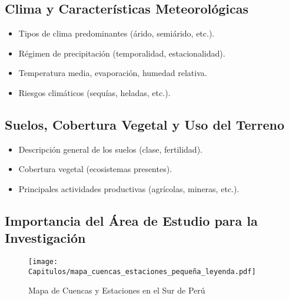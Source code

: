\subsection{Clima y Características Meteorológicas}
  \begin{itemize}
    \item Tipos de clima predominantes (árido, semiárido, etc.).
    \item Régimen de precipitación (temporalidad, estacionalidad).
    \item Temperatura media, evaporación, humedad relativa.
    \item Riesgos climáticos (sequías, heladas, etc.).
  \end{itemize}

\subsection{Suelos, Cobertura Vegetal y Uso del Terreno}
  \begin{itemize}
    \item Descripción general de los suelos (clase, fertilidad).
    \item Cobertura vegetal (ecosistemas presentes).
    \item Principales actividades productivas (agrícolas, mineras, etc.).
  \end{itemize}

\subsection{Importancia del Área de Estudio para la Investigación}

 \begin{figure}[h] %
    \centering
     \caption{
        {Mapa de Cuencas y Estaciones en el Sur de Perú}\\[0.5em]
    }
    \texttt{[image: Capitulos/mapa\_cuencas\_estaciones\_pequeña\_leyenda.pdf]}
    \label{fig:mapa_localizacion}
\end{figure}


  
